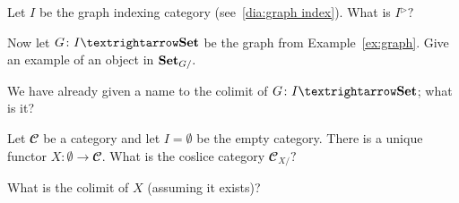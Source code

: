 \documentclass[../main/CT4S-EN-RU]{subfiles}
\begin{document}
\begin{exerciseENG}
Let $I$ be the graph indexing category (see~\ref{dia:graph index}).
\sexc What is $I{^{⊳}}?$
\item Now let $G\colon I{→}\Set$ be the graph from Example~\ref{ex:graph}. Give an example of an object in ${\mathbf{Set}}_{G/}.$ 
\item We have already given a name to the colimit of $G\colon I{→}\Set$; what is it?
\endsexc
\end{exerciseENG}

\begin{exerciseRUS}
\end{exerciseRUS}

\begin{exerciseENG}\label{exc:initial as colimit}
Let ${𝓒}$ be a category and let $I=\emptyset$ be the empty category. There is a unique functor $X\colon\emptyset{→}{𝓒}.$
\sexc What is the coslice category ${𝓒}_{X/}?$
\item What is the colimit of $X$ (assuming it exists)?
\endsexc
\end{exerciseENG}

\begin{exerciseRUS}\label{exc:initial as colimit}
\end{exerciseRUS}
\end{document}
